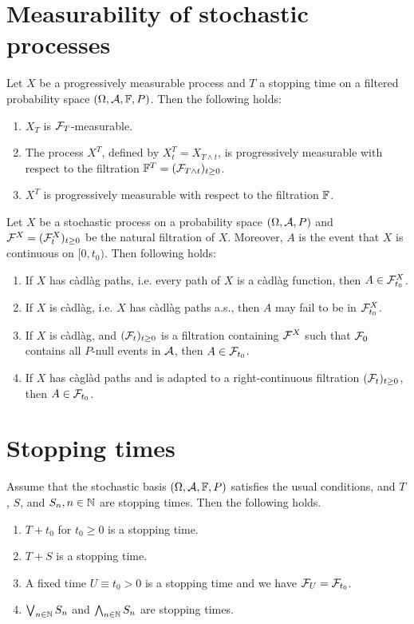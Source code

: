 \section{Measurability of stochastic processes}

 Let $X$ be a progressively
measurable process and $T$ a stopping time on a filtered probability space
$(\Omega, \mathcal A, \mathbb F, P)$. Then the following holds:
\begin{enumerate}
    \item $X_T$ is $\mathcal F_{T}$-measurable.
    \item The process $X^{T}$, defined by $X^{T}_{t} = X_{T \wedge t}$, is
        progressively measurable with respect to the filtration $\mathbb F^{T} =
        (\mathcal F_{T \wedge t})_{t\geq 0}$.
    \item $X^T$ is progressively measurable with respect to the filtration $\mathbb F$.
\end{enumerate}

 Let $X$ be a stochastic process
on a probability space $(\Omega, \mathcal A, P)$ and $\mathcal F^{X}=(\mathcal F^{X}_{t})_{t\geq 0}$
be the natural filtration of $X$. Moreover, $A$ is the event that $X$ is
continuous on $[0, t_0)$. Then following holds:
\begin{enumerate}
    \item If $X$ has c\`adl\`ag paths, i.e. every path of $X$ is a c\`adl\`ag
        function, then $A\in \mathcal F^{X}_{t_0}$. 

    \item If $X$ is c\`adl\`ag, i.e. $X$ has c\`adl\`ag paths a.s., then $A$
        may fail to be in $\mathcal F^{X}_{t_0}$.

    \item If $X$ is c\`adl\`ag, and $(\mathcal F_{t})_{t\geq 0}$ is a filtration
        containing $\mathcal F^{X}$ such that $\mathcal F_{0}$ contains all $P$-null events
        in $\mathcal A$, then $A\in \mathcal F_{t_0}$.

    \item If $X$ has c\`agl\`ad paths and is adapted to a right-continuous
        filtration $(\mathcal F_{t})_{t\geq 0}$, then $A\in \mathcal F_{t_{0}}$. 
\end{enumerate}


\section{Stopping times}

 Assume that the stochastic basis
$(\Omega, \mathcal A, \mathbb F, P)$ satisfies the usual conditions, and $T$, $S$, and $S_n,
n\in\mathbb N$ are stopping times. Then the following holds.
\begin{enumerate}
    \item $T + t_0$ for $t_0\geq 0$ is a stopping time.
    \item $T+S$ is a stopping time.
    \item A fixed time $U \equiv t_0>0$ is a stopping time and we have $\mathcal F_U = \mathcal F_{t_0}$.
    \item $\bigvee_{n\in\mathbb N} S_n$ and $\bigwedge_{n\in\mathbb N} S_n$ are stopping times. 
\end{enumerate}

